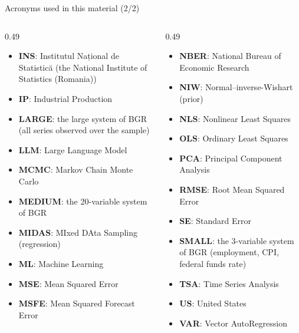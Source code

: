 \begin{frame}{Acronyms used in this material (2/2)}
\begin{columns}[T]
\begin{column}{0.49\textwidth}
\begin{itemize}\setlength{\itemsep}{0pt}
    \item \textbf{INS}: Institutul Național de Statistică (the National Institute of Statistics (Romania))
    \item \textbf{IP}: Industrial Production
    \item \textbf{LARGE}: the large system of BGR (all series observed over the sample)
    \item \textbf{LLM}: Large Language Model
    \item \textbf{MCMC}: Markov Chain Monte Carlo
    \item \textbf{MEDIUM}: the 20-variable system of BGR
    \item \textbf{MIDAS}: MIxed DAta Sampling (regression)
    \item \textbf{ML}: Machine Learning
    \item \textbf{MSE}: Mean Squared Error
    \item \textbf{MSFE}: Mean Squared Forecast Error
\end{itemize}
\end{column}
\begin{column}{0.49\textwidth}
\begin{itemize}\setlength{\itemsep}{0pt}
    \item \textbf{NBER}: National Bureau of Economic Research
    \item \textbf{NIW}: Normal–inverse-Wishart (prior)
    \item \textbf{NLS}: Nonlinear Least Squares
    \item \textbf{OLS}: Ordinary Least Squares
    \item \textbf{PCA}: Principal Component Analysis
    \item \textbf{RMSE}: Root Mean Squared Error
    \item \textbf{SE}: Standard Error
    \item \textbf{SMALL}: the 3-variable system of BGR (employment, CPI, federal funds rate)
    \item \textbf{TSA}: Time Series Analysis
    \item \textbf{US}: United States
    \item \textbf{VAR}: Vector AutoRegression
\end{itemize}
\end{column}
\end{columns}
\end{frame}

